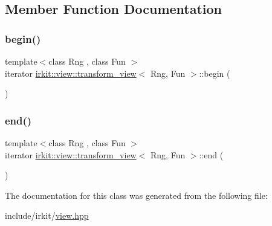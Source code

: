 \subsection{Member Function Documentation}
\mbox{\label{classirkit_1_1view_1_1transform__view_a6a4643fb239fa9ac74bbc9bfbfd806e9}} 
\subsubsection{\texorpdfstring{begin()}{begin()}}
{\footnotesize\ttfamily template$<$class Rng , class Fun $>$ \\
iterator \hyperlink{classirkit_1_1view_1_1transform__view}{irkit\+::view\+::transform\+\_\+view}$<$ Rng, Fun $>$\+::begin (\begin{DoxyParamCaption}{ }\end{DoxyParamCaption})\hspace{0.3cm}{\ttfamily [inline]}}

\mbox{\label{classirkit_1_1view_1_1transform__view_ad0b0e9db406e42257883d29adecce451}} 
\subsubsection{\texorpdfstring{end()}{end()}}
{\footnotesize\ttfamily template$<$class Rng , class Fun $>$ \\
iterator \hyperlink{classirkit_1_1view_1_1transform__view}{irkit\+::view\+::transform\+\_\+view}$<$ Rng, Fun $>$\+::end (\begin{DoxyParamCaption}{ }\end{DoxyParamCaption})\hspace{0.3cm}{\ttfamily [inline]}}



The documentation for this class was generated from the following file\+:\begin{DoxyCompactItemize}
\item 
include/irkit/\hyperlink{view_8hpp}{view.\+hpp}\end{DoxyCompactItemize}
